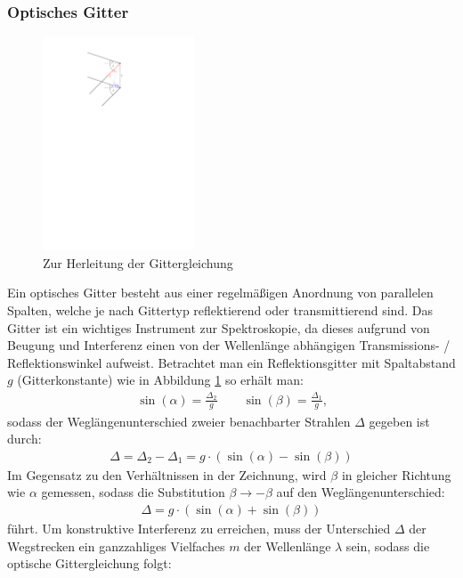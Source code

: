 \documentclass[11pt, a4paper]{article}
\numberwithin{equation}{section}
\begin{document}
\subsubsection{Optisches Gitter}
\begin{figure}
	\centering
	\includegraphics[width=0.4\textwidth]{./figures/herleitung_gitter.pdf}
	\caption{Zur Herleitung der Gittergleichung}
	\label{fig:gitter}
\end{figure}
Ein optisches Gitter besteht aus einer regelmäßigen Anordnung von parallelen Spalten, welche je nach Gittertyp reflektierend oder transmittierend sind.
Das Gitter ist ein wichtiges Instrument zur Spektroskopie, da dieses aufgrund von Beugung und Interferenz einen von der Wellenlänge abhängigen Transmissions- / Reflektionswinkel aufweist.
Betrachtet man ein Reflektionsgitter mit Spaltabstand $g$ (Gitterkonstante) wie in Abbildung \ref{fig:gitter} so erhält man:
\begin{align}
	\sin(\alpha) = \frac{\Delta_2}{g} \qquad \sin(\beta) = \frac{\Delta_1}{g} \text{,}
\end{align}
sodass der Weglängenunterschied zweier benachbarter Strahlen $\Delta$ gegeben ist durch:
\begin{align}
	\Delta = \Delta_2 - \Delta_1 = g \cdot \left(\sin(\alpha) - \sin(\beta) \right)
\end{align}
Im Gegensatz zu den Verhältnissen in der Zeichnung, wird $\beta$ in gleicher Richtung wie $\alpha$ gemessen, sodass die Substitution $\beta \rightarrow -\beta$ auf den Weglängenunterschied:
\begin{align}
	\Delta = g \cdot \left(\sin(\alpha) + \sin(\beta) \right)
\end{align}
führt.
Um konstruktive Interferenz zu erreichen, muss der Unterschied $\Delta$ der Wegstrecken ein ganzzahliges Vielfaches $m$ der Wellenlänge $\lambda$ sein, sodass die optische Gittergleichung folgt:
\end{document}
